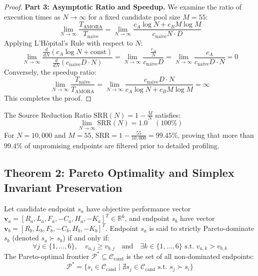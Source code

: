 \begin{proof}
\textbf{Part 3: Asymptotic Ratio and Speedup.}
We examine the ratio of execution times as $N \to \infty$ for a fixed candidate pool size $M = 55$:
\begin{equation}
    \lim_{N \to \infty} \frac{T_{\text{AMORA}}}{T_{\text{naive}}} = \lim_{N \to \infty} \frac{c_A \log N + c_B M \log M}{c_{\text{naive}} N \cdot D}
\end{equation}
Applying L'H\^{o}pital's Rule with respect to $N$:
\begin{equation}
    \lim_{N \to \infty} \frac{\frac{d}{dN}(c_A \log N + \text{const})}{\frac{d}{dN}(c_{\text{naive}} D \cdot N)} = \lim_{N \to \infty} \frac{\frac{c_A}{N}}{c_{\text{naive}} D} = \lim_{N \to \infty} \frac{c_A}{c_{\text{naive}} D \cdot N} = 0
\end{equation}
Conversely, the speedup ratio:
\begin{equation}
    \lim_{N \to \infty} \frac{T_{\text{naive}}}{T_{\text{AMORA}}} = \lim_{N \to \infty} \frac{c_{\text{naive}} D \cdot N}{c_A \log N + c_B M \log M} = \infty
\end{equation}
This completes the proof.
\end{proof}

\begin{corollary}
The Source Reduction Ratio $\text{SRR}(N) = 1 - \frac{M}{N}$ satisfies:
\begin{equation}
    \lim_{N \to \infty} \text{SRR}(N) = 1.0 \quad (100\%)
\end{equation}
For $N = 10,000$ and $M = 55$, $\text{SRR} = 1 - \frac{55}{10,000} = 99.45\%$, proving that more than $99.4\%$ of unpromising endpoints are filtered prior to detailed profiling.
\end{corollary}

\subsection{Theorem 2: Pareto Optimality and Simplex Invariant Preservation}
\label{subsec:proof_pareto}

\begin{definition}
Let candidate endpoint $s_a$ have objective performance vector $\mathbf{v}_a = [R_a, L_a, F_a, -C_a, H_a, -K_a]^T \in \mathbb{R}^6$, and endpoint $s_b$ have vector $\mathbf{v}_b = [R_b, L_b, F_b, -C_b, H_b, -K_b]^T$. Endpoint $s_a$ is said to strictly Pareto-dominate $s_b$ (denoted $s_a \succ s_b$) if and only if:
\begin{equation}
    \forall j \in \{1, \dots, 6\}, \quad v_{a, j} \ge v_{b, j} \quad \text{and} \quad \exists k \in \{1, \dots, 6\} \text{ s.t. } v_{a, k} > v_{b, k}
\end{equation}
The Pareto-optimal frontier $\mathcal{P}^* \subseteq \mathcal{C}_{\text{cand}}$ is the set of all non-dominated endpoints:
\begin{equation}
    \mathcal{P}^* = \{s_i \in \mathcal{C}_{\text{cand}} \mid \nexists s_j \in \mathcal{C}_{\text{cand}} \text{ s.t. } s_j \succ s_i\}
\end{equation}
\end{definition}

